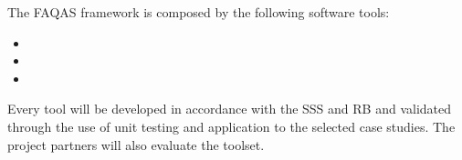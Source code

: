 The FAQAS framework is composed by the following software tools:
\begin{itemize}
  \item \MASS
  \item \DAMA
  \item \SEMUS
\end{itemize}

Every tool will be developed in accordance with the SSS and RB and validated through the use of unit testing and application to the selected case studies.
The project partners will also evaluate the toolset.
